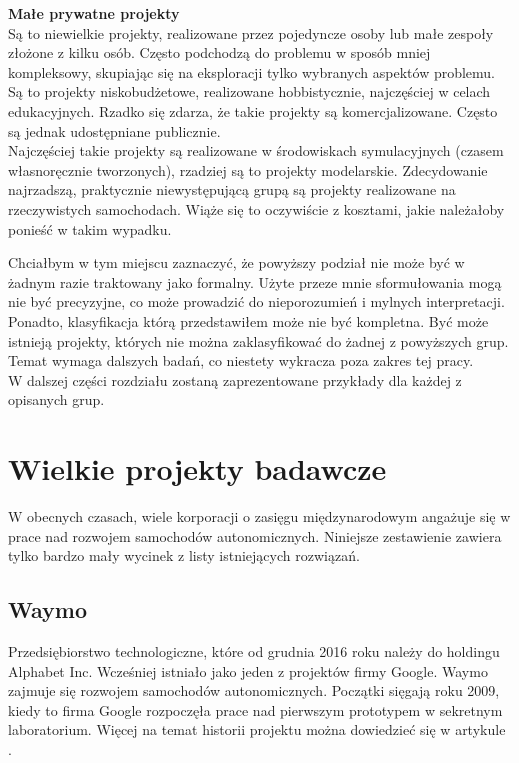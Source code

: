 \begin{enumerate*}
\item \textbf{Małe prywatne projekty} \\
Są to niewielkie projekty, realizowane przez pojedyncze osoby lub małe zespoły złożone z kilku osób. Często podchodzą do problemu w sposób mniej kompleksowy, skupiając się na eksploracji tylko wybranych aspektów problemu. Są to projekty niskobudżetowe, realizowane hobbistycznie, najczęściej w celach edukacyjnych. Rzadko się zdarza, że takie projekty są komercjalizowane. Często są jednak udostępniane publicznie. \\
Najczęściej takie projekty są realizowane w środowiskach symulacyjnych (czasem własnoręcznie tworzonych), rzadziej są to projekty modelarskie. Zdecydowanie najrzadszą, praktycznie niewystępującą grupą są projekty realizowane na rzeczywistych samochodach. Wiąże się to oczywiście z kosztami, jakie należałoby ponieść w takim wypadku.

\end{enumerate*}

Chciałbym w tym miejscu zaznaczyć, że powyższy podział nie może być w żadnym razie traktowany jako formalny. 
Użyte przeze mnie sformułowania mogą nie być precyzyjne, co może prowadzić do nieporozumień i mylnych interpretacji.
Ponadto, klasyfikacja którą przedstawiłem może nie być kompletna. Być może istnieją projekty, których nie można zaklasyfikować do żadnej z powyższych grup. Temat wymaga dalszych badań, co niestety wykracza poza zakres tej pracy. \\
W dalszej części rozdziału zostaną zaprezentowane przykłady dla każdej z opisanych grup. 

\section{Wielkie projekty badawcze}
W obecnych czasach, wiele korporacji o zasięgu międzynarodowym angażuje się w prace nad rozwojem samochodów autonomicznych. 
Niniejsze zestawienie zawiera tylko bardzo mały wycinek z listy istniejących rozwiązań.

\subsection{Waymo}
Przedsiębiorstwo technologiczne, które od grudnia 2016 roku należy do holdingu Alphabet Inc. Wcześniej istniało jako jeden z projektów firmy Google. Waymo zajmuje się rozwojem samochodów autonomicznych. Początki sięgają roku 2009, kiedy to firma Google rozpoczęła prace nad pierwszym prototypem w sekretnym laboratorium. Więcej na temat historii projektu można dowiedzieć się w artykule \cite{google:carHistory}.

